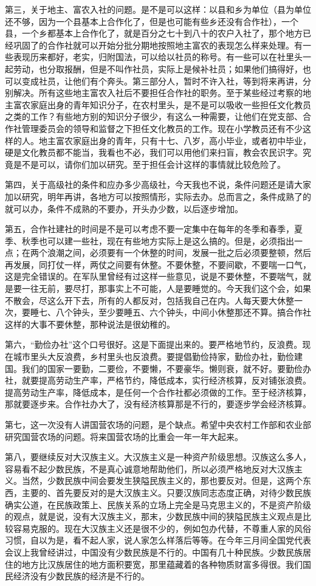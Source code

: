 第三，关于地主、富农入社的问题。是不是可以这样：以县和乡为单位（县为单位还不够，因为一个县基本上合作化了，但是也可能有些乡还没有合作社），一个县，一个乡都基本上合作化了，就是百分之七十到八十的农户入社了，那个地方已经巩固了的合作社就可以开始分批分期地按照地主富农的表现怎么样来处理。有一些表现历来都好，老实，归附国法，可以给以社员的称号。有一些可以在社里头一起劳动，也分取报酬，但是不叫作社员，实际上是候补社员；如果他们搞得好，也可以变成社员，让他们有个奔头。第三部分人，暂时不许入社，等到将来再讲，分别解决。所有这些地主富农入社后不要担任合作社的职务。至于某些经过考察的地主富农家庭出身的青年知识分子，在农村里头，是不是可以吸收一些担任文化教员之类的工作？有些地方别的知识分子很少，有这么一种需要，让他们在党支部、合作社管理委员会的领导和监督之下担任文化教员的工作。现在小学教员还有不少这样的人。地主富农家庭出身的青年，只有十七、八岁，高小毕业，或者初中毕业，硬是文化教员都不能当，我看也不必，我们可以用他们来扫盲，教会农民识字。究竟是不是可以，请你们加以研究。至于担任会计这样的事情就比较危险了。

第四，关于高级社的条件和应办多少高级社，今天我也不说，条件问题还是请大家加以研究，明年再讲，各地方可以按照情形，实际去办。总而言之，条件成熟了的就可以办，条件不成熟的不要办，开头办少数，以后逐步增加。

第五，合作社建社的时间是不是可以考虑不要一定集中在每年的冬季和春季，夏季、秋季也可以建一些社，现在有些地方实际上是这么搞的。但是，必须指出一点；在两个浪潮之间，必须要有一个休整的时间，发展一批之后必须要整顿，然后再发展，同打仗一样，两仗之间要有休整。不要休整，不要间歇，不要喘一口气，这是完全错误的。在军队里曾经有过这样一些意见，说是不要休整，不要喘气，就是要一往无前，要尽打，那事实上不可能，人是要睡觉的。今天我们这个会，如果不散会，尽这么开下去，所有的人都反对，包括我自己在内。人每天要大休整一次，要睡七、八个钟头，至少要睡五、六个钟头，中间小休整那还不算。搞合作社这样的大事不要休整，那种说法是很幼稚的。

第六，“勤俭办社”这个口号很好。这是下面提出来的。要严格地节约，反浪费。现在城市里头大反浪费，乡村里头也反浪费。要提倡勤俭持家，勤俭办社，勤俭建国。我们的国家一要勤，二要俭，不要懒，不要豪华。懒则衰，就不好。要勤俭办社，就要提高劳动生产率，严格节约，降低成本，实行经济核算，反对铺张浪费。提高劳动生产率，降低成本，是任何一个合作社都必须做的工作。至于经济核算，那就要逐步来。合作社办大了，没有经济核算那是不行的，要逐步学会经济核算。

第七，这一次没有人讲国营农场的问题，是个缺点。希望中央农村工作部和农业部研究国营农场的问题。将来国营农场的比重会一年一年大起来。

第八，要继续反对大汉族主义。大汉族主义是一种资产阶级思想。汉族这么多人，容易看不起少数民族，不是真心诚意地帮助他们，所以必须严格地反对大汉族主义。当然，少数民族中间会要发生狭隘民族主义的，那也要反对。但是，这两个东西，主要的、首先要反对的是大汉族主义。只要汉族同志态度正确，对待少数民族确实公道，在民族政策上、民族关系的立场上完全是马克思主义的，不是资产阶级的观点，就是说，没有大汉族主义，那末，少数民族中间的狭隘民族主义观点是比较容易克服的。现在大汉族主义还是很不少的，例如包办代替，不尊重人家的风俗习惯，自以为是，看不起人家，说人家怎么样落后等等。在今年三月间全国党代表会议上我曾经讲过，中国没有少数民族是不行的。中国有几十种民族。少数民族居住的地方比汉族居住的地方面积要宽，那里蕴藏着的各种物质财富多得很。我们国民经济没有少数民族的经济是不行的。

